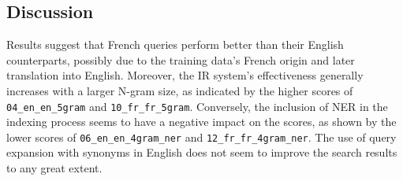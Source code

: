 
\subsection{Discussion}\label{subsec:discussion}

Results suggest that French queries perform better than their English counterparts, possibly due to the training data's
French origin and later translation into English.
Moreover, the IR system's effectiveness generally increases with a larger N-gram size, as indicated by the higher scores
of \texttt{04\_en\_en\_5gram} and \texttt{10\_fr\_fr\_5gram}.
Conversely, the inclusion of NER in the indexing process seems to have a negative impact on the scores, as shown by the
lower scores of \texttt{06\_en\_en\_4gram\_ner} and \texttt{12\_fr\_fr\_4gram\_ner}.
The use of query expansion with synonyms in English does not seem to improve the search results to any great extent.\\

